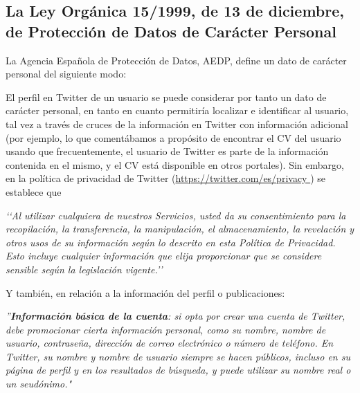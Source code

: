 \subsection{La Ley Orgánica 15/1999, de 13 de diciembre, de Protección de Datos
de Carácter Personal}
\label{subsection:LOPD}

La Agencia Española de Protección de Datos, AEDP, define un dato de carácter personal del siguiente modo:


El perfil en Twitter de un usuario se puede considerar por tanto un dato de carácter personal, en tanto en cuanto
permitiría localizar e identificar al usuario, tal vez a través de cruces de la información en Twitter con
información adicional (por ejemplo, lo que comentábamos a propósito de encontrar el CV del usuario usando que
frecuentemente, el usuario de Twitter es parte de la información contenida en el mismo, y el CV está disponible en otros 
portales). Sin embargo, en la política de privacidad de Twitter (\url{https://twitter.com/es/privacy })
se establece que

\leftskip=1cm
\rightskip=1cm
{\em \lq\lq Al utilizar cualquiera de nuestros Servicios, usted da su consentimiento para la recopilación, 
 la transferencia, la manipulación, el almacenamiento, la revelación y otros usos de su información 
 según lo descrito en esta Política de Privacidad. Esto incluye cualquier información que elija proporcionar que 
 se considere sensible según la legislación vigente.\rq\rq}

\leftskip=0pt\rightskip=0pt




\noindent Y también, en relación a la información del perfil o publicaciones:

\leftskip=1cm
\rightskip=1cm
{\em ''{\bf Información básica de la cuenta}: si opta por crear una cuenta de Twitter, debe promocionar cierta información personal, 
como su nombre, nombre de usuario, contraseña, dirección de correo electrónico o número de teléfono. 
En Twitter, su nombre y nombre de usuario siempre se hacen públicos, incluso en su página de perfil y en los resultados de búsqueda, 
y puede utilizar su nombre real o un seudónimo."}


